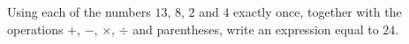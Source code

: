 Using each of the numbers $13$, $8$, $2$ and $4$ exactly once, together with the operations $+$, $-$, $\times$, $\div$ and parentheses, write an expression equal to $24$.
